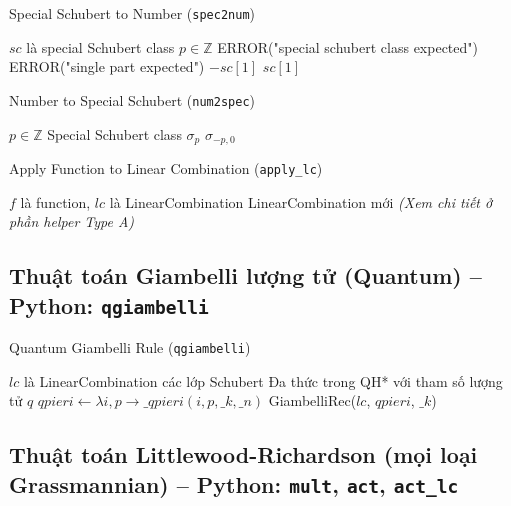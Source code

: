 \begin{algorithm}[H]
\caption{Special Schubert to Number (\texttt{spec2num})}
\begin{algorithmic}[1]
\REQUIRE $sc$ là special Schubert class
\ENSURE $p \in \mathbb{Z}$
    \STATE ERROR("special schubert class expected")
\ENDIF
{}
    \STATE ERROR("single part expected")
\ENDIF
{}
    \RETURN $-sc[1]$
\ELSE
    \RETURN $sc[1]$
\ENDIF
\end{algorithmic}
\end{algorithm}

\begin{algorithm}[H]
\caption{Number to Special Schubert (\texttt{num2spec})}
\begin{algorithmic}[1]
\REQUIRE $p \in \mathbb{Z}$
\ENSURE Special Schubert class
    \RETURN $\sigma_p$
\ELSE
    \RETURN $\sigma_{-p,0}$
\ENDIF
\end{algorithmic}
\end{algorithm}

\begin{algorithm}[H]
\caption{Apply Function to Linear Combination (\texttt{apply\_lc})}
\begin{algorithmic}[1]
\REQUIRE $f$ là function, $lc$ là LinearCombination
\ENSURE LinearCombination mới
\STATE \textit{(Xem chi tiết ở phần helper Type A)}
\end{algorithmic}
\end{algorithm}

\subsection*{Thuật toán Giambelli lượng tử (Quantum) -- Python: \texttt{qgiambelli}}

\begin{algorithm}[H]
\caption{Quantum Giambelli Rule (\texttt{qgiambelli})}
\begin{algorithmic}[1]
\REQUIRE $lc$ là LinearCombination các lớp Schubert
\ENSURE Đa thức trong QH* với tham số lượng tử $q$
\STATE $qpieri \gets \lambda i, p \to \_qpieri(i, p, \_k, \_n)$
\RETURN GiambelliRec($lc$, $qpieri$, $\_k$)
\end{algorithmic}
\end{algorithm}


\subsection*{Thuật toán Littlewood-Richardson (mọi loại Grassmannian) -- Python: \texttt{mult}, \texttt{act}, \texttt{act\_lc}}

